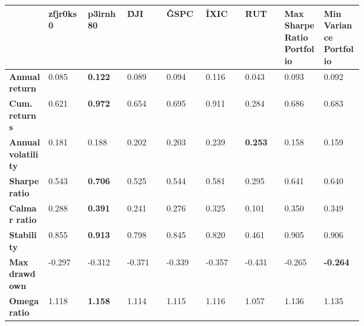 \documentclass[../xlapes02]{subfiles}
\begin{document}
    \begin{table}[h!]
        \centering
        {\footnotesize\begin{tabular}{*{9}{|m{0.075\linewidth}|}}
                          \toprule
                          & \bfseries zfjr0ks0 & \bfseries p3irnh80                   & \bfseries \^DJI                       & \bfseries \^GSPC & \bfseries \^IXIC & \bfseries \^RUT & \bfseries Max Sharpe Ratio Portfolio & \bfseries Min Variance Portfolio \\[0.5cm]
                          \midrule
                          \bfseries Annual return       & 0.085              & \color[HTML]{00F000} \bfseries 0.122 & 0.089                                 & 0.094            & 0.116 & 0.043 & 0.093 & 0.092 \\[0.5cm]
                          \bfseries Cum. returns        & 0.621              & \color[HTML]{00F000} \bfseries 0.972 & 0.654                                 & 0.695            & 0.911 & 0.284 & 0.686 & 0.683 \\[0.5cm]
                          \bfseries Annual volatility   & 0.181              & 0.188                                & 0.202                                 & 0.203            & 0.239            & \color[HTML]{00F000} \bfseries 0.253 & 0.158 & 0.159 \\[0.5cm]
                          \bfseries Sharpe ratio        & 0.543              & \color[HTML]{00F000} \bfseries 0.706 & 0.525                                 & 0.544            & 0.581 & 0.295 & 0.641 & 0.640 \\[0.5cm]
                          \bfseries Calmar ratio        & 0.288              & \color[HTML]{00F000} \bfseries 0.391 & 0.241                                 & 0.276            & 0.325 & 0.101 & 0.350 & 0.349 \\[0.5cm]
                          \bfseries Stability           & 0.855              & \color[HTML]{00F000} \bfseries 0.913 & 0.798                                 & 0.845            & 0.820 & 0.461 & 0.905 & 0.906 \\[0.5cm]
                          \bfseries Max drawdown        & -0.297             & -0.312                               & -0.371                                & -0.339           & -0.357           & -0.431                               & -0.265                               & \color[HTML]{00F000} \bfseries -0.264 \\[0.5cm]
                          \bfseries Omega ratio         & 1.118              & \color[HTML]{00F000} \bfseries 1.158 & 1.114                                 & 1.115            & 1.116 & 1.057 & 1.136 & 1.135 \\[0.5cm]

\end{tabular}}
\end{table}
\end{document}

